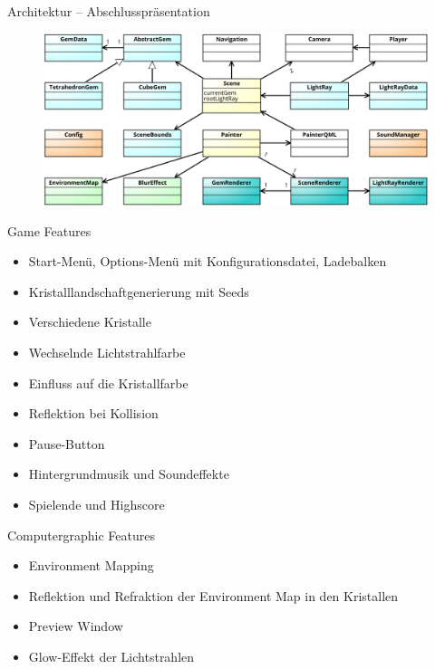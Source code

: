 \begin{frame}{Architektur -- Abschlusspräsentation}
	\begin{figure}
		\centering
		\includegraphics[width=\textwidth, height=0.7\textheight, keepaspectratio]{images/klassendiagramm-final}
	\end{figure}
\end{frame}

\begin{frame}{Game Features}
	\begin{itemize}
		\item Start-Menü, Options-Menü mit Konfigurationsdatei, Ladebalken
		\item Kristalllandschaftgenerierung mit Seeds
		\item Verschiedene Kristalle
		\item Wechselnde Lichtstrahlfarbe
		\item Einfluss auf die Kristallfarbe
		\item Reflektion bei Kollision
		\item Pause-Button
		\item Hintergrundmusik und Soundeffekte
		\item Spielende und Highscore
	\end{itemize}
\end{frame}

\begin{frame}{Computergraphic Features}
	\begin{itemize}
		\item Environment Mapping
		\item Reflektion und Refraktion der Environment Map in den Kristallen
		\item Preview Window 
		\item Glow-Effekt der Lichtstrahlen
	\end{itemize}
\end{frame}

